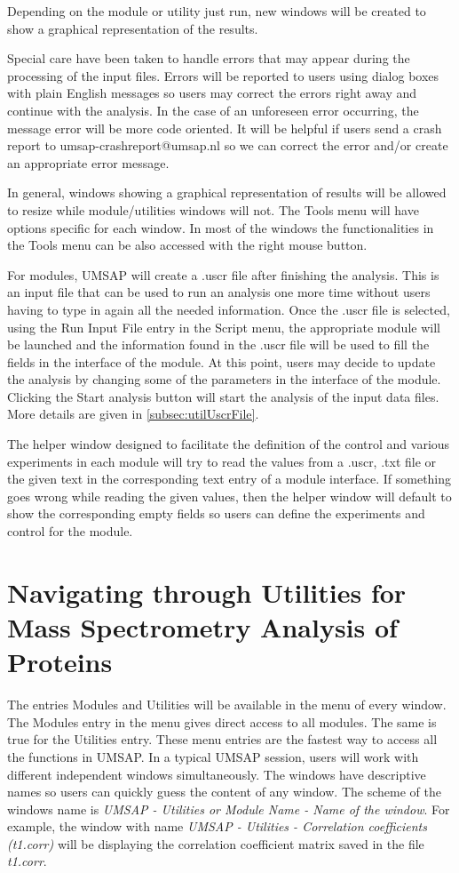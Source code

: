 Depending on the module or utility just run, new windows will be created to show a graphical representation of the results.

Special care have been taken to handle errors that may appear during the processing of the input files. Errors will be reported to users using dialog boxes with plain English messages so users may correct the errors right away and continue with the analysis. In the case of an unforeseen error occurring, the message error will be more code oriented. It will be helpful if users send a crash report to umsap-crashreport@umsap.nl so we can correct the error and/or create an appropriate error message. 

In general, windows showing a graphical representation of results will be allowed to resize while module/utilities windows will not. The Tools menu will have options specific for each window. In most of the windows the functionalities in the Tools menu can be also accessed with the right mouse button.

For modules, UMSAP will create a .uscr\label{par:uscrFile} file after finishing the analysis. This is an input file that can be used to run an analysis one more time without users having to type in again all the needed information. Once the .uscr file is selected, using the Run Input File entry in the Script menu, the appropriate module will be launched and the information found in the .uscr file will be used to fill the fields in the interface of the module. At this point, users may decide to update the analysis by changing some of the parameters in the interface of the module. Clicking the Start analysis button will start the analysis of the input data files. More details are given in \autoref{subsec:utilUscrFile}.  

The helper window designed to facilitate the definition of the control and various experiments in each module will try to read the values from a .uscr, .txt file or the given text in the corresponding text entry of a module interface. If something goes wrong while reading the given values, then the helper window will default to show the corresponding empty fields so users can define the experiments and control for the module.

\section{Navigating through Utilities for Mass Spectrometry Analysis of Proteins}

The entries Modules and Utilities will be available in the menu of every window. The Modules entry in the menu gives direct access to all modules. The same is true for the Utilities entry. These menu entries are the fastest way to access all the functions in UMSAP. In a typical UMSAP session, users will work with different independent windows simultaneously. The windows have descriptive names so users can quickly guess the content of any window. The scheme of the windows name is \textit{UMSAP - Utilities or Module Name - Name of the window}. For example, the window with name \textit{UMSAP - Utilities - Correlation coefficients (t\num[detect-all]{1}.corr)} will be displaying the correlation coefficient matrix saved in the file \textit{t\num{1}.corr}.

